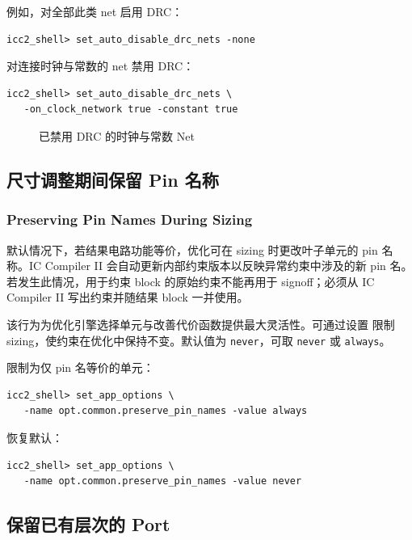 例如，对全部此类 net 启用 DRC：
\begin{lstlisting}
icc2_shell> set_auto_disable_drc_nets -none
\end{lstlisting}

对连接时钟与常数的 net 禁用 DRC：
\begin{lstlisting}
icc2_shell> set_auto_disable_drc_nets \
   -on_clock_network true -constant true
\end{lstlisting}

\begin{figure}[htbp]
\centering
{}
\caption{已禁用 DRC 的时钟与常数 Net}
\label{fig:ch2b-drc-disabled}
\end{figure}

\subsection{尺寸调整期间保留 Pin 名称}
\subsubsection*{Preserving Pin Names During Sizing}

默认情况下，若结果电路功能等价，优化可在 sizing 时更改叶子单元的 pin 名称。IC Compiler II 会自动更新内部约束版本以反映异常约束中涉及的新 pin 名。若发生此情况，用于约束 block 的原始约束不能再用于 signoff；必须从 IC Compiler II 写出约束并随结果 block 一并使用。

该行为为优化引擎选择单元与改善代价函数提供最大灵活性。可通过设置  限制 sizing，使约束在优化中保持不变。默认值为 \texttt{never}，可取 \texttt{never} 或 \texttt{always}。

限制为仅 pin 名等价的单元：
\begin{lstlisting}
icc2_shell> set_app_options \
   -name opt.common.preserve_pin_names -value always
\end{lstlisting}

恢复默认：
\begin{lstlisting}
icc2_shell> set_app_options \
   -name opt.common.preserve_pin_names -value never
\end{lstlisting}

\subsection{保留已有层次的 Port}
